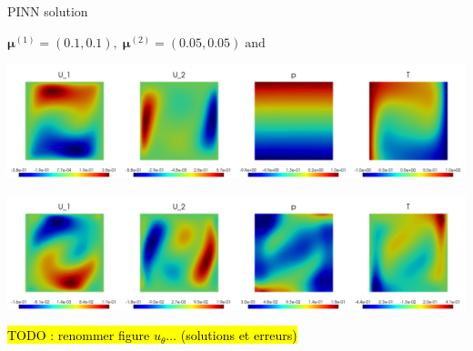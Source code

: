 \begin{frame}{PINN solution}
    \vspace{-5pt}
    \begin{center}
        $\bm{\mu}^{(1)} = (0.1,0.1), \; \bm{\mu}^{(2)} = (0.05,0.05) \; \text{and} \;$

        \includegraphics[width=\linewidth]{images/pinn/training/PINN_plot_case4_v5_param3.png}
        
        \includegraphics[width=\linewidth]{images/pinn/training/PINN_error_plot_case4_v5_param3.png}
    \end{center}

    \hl{TODO : renommer figure $u_\theta\dots$ (solutions et erreurs)}

\end{frame}